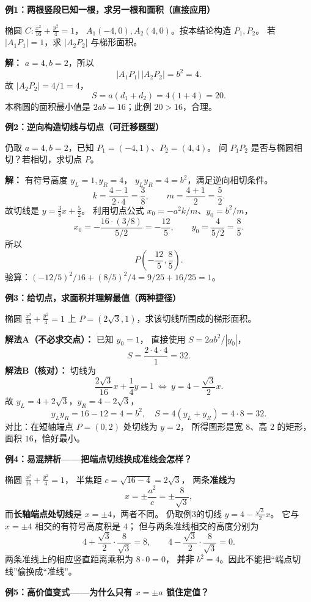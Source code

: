 \begin{examplebox}
\textbf{例1：两根竖段已知一根，求另一根和面积（直接应用）}

椭圆 $C:\frac{x^2}{16}+\frac{y^2}{4}=1$，
$A_1(-4,0),A_2(4,0)$。按本结论构造 $P_1,P_2$。
若 $|A_1P_1|=1$，求 $|A_2P_2|$ 与梯形面积。

\textbf{解：} $a=4,b=2$，所以
\[
|A_1P_1|\,|A_2P_2|=b^2=4.
\]
故 $|A_2P_2|=4/1=4$，
\[
S=a(d_1+d_2)=4(1+4)=\boxed{20}.
\]
本椭圆的面积最小值是 $2ab=16$；此例 $20>16$，合理。

\medskip
\textbf{例2：逆向构造切线与切点（可迁移题型）}

仍取 $a=4,b=2$，已知 $P_1=(-4,1)$、$P_2=(4,4)$。
问 $P_1P_2$ 是否与椭圆相切？若相切，求切点 $P$。

\textbf{解：} 有符号高度 $y_L=1,y_R=4$，
$y_Ly_R=4=b^2$，满足逆向相切条件。
\[
k=\frac{4-1}{2\cdot4}=\frac38,
\qquad m=\frac{4+1}{2}=\frac52.
\]
故切线是 $y=\frac38x+\frac52$。
利用切点公式 $x_0=-a^2k/m$、$y_0=b^2/m$，
\[
x_0=-\frac{16\cdot(3/8)}{5/2}=-\frac{12}{5},
\qquad y_0=\frac4{5/2}=\frac85.
\]
所以
\[
\boxed{P\left(-\frac{12}{5},\frac85\right)}.
\]
验算：$(-12/5)^2/16+(8/5)^2/4=9/25+16/25=1$。

\medskip
\textbf{例3：给切点，求面积并理解最值（两种捷径）}

椭圆 $\frac{x^2}{16}+\frac{y^2}{4}=1$ 上
$P=(2\sqrt3,1)$，求该切线所围成的梯形面积。

\textbf{解法A（不必求交点）：} 已知 $y_0=1$，
直接使用 $S=2ab^2/|y_0|$，
\[
S=\frac{2\cdot4\cdot4}{1}=\boxed{32}.
\]
\textbf{解法B（核对）：} 切线为
\[
\frac{2\sqrt3}{16}x+\frac14y=1
\ \Longleftrightarrow\ y=4-\frac{\sqrt3}{2}x.
\]
故 $y_L=4+2\sqrt3$，$y_R=4-2\sqrt3$，
\[
y_Ly_R=16-12=4=b^2,
\quad S=4(y_L+y_R)=4\cdot8=\boxed{32}.
\]
对比：在短轴端点 $P=(0,2)$ 处切线为 $y=2$，
所得图形是宽 $8$、高 $2$ 的矩形，面积 $16$，恰好最小。

\medskip
\textbf{例4：易混辨析——把端点切线换成准线会怎样？}

椭圆 $\frac{x^2}{16}+\frac{y^2}{4}=1$，
半焦距 $c=\sqrt{16-4}=2\sqrt3$，
两条\textbf{准线}为
\[
x=\pm\frac{a^2}{c}=\pm\frac8{\sqrt3},
\]
而\textbf{长轴端点处切线}是 $x=\pm4$，两者不同。
仍取例3的切线 $y=4-\frac{\sqrt3}{2}x$。
它与 $x=\pm4$ 相交的有符号高度积是 $4$；
但与两条准线相交的高度分别为
\[
4+\frac{\sqrt3}{2}\cdot\frac8{\sqrt3}=8,
\qquad
4-\frac{\sqrt3}{2}\cdot\frac8{\sqrt3}=0.
\]
两条准线上的相应竖直距离乘积为 $8\cdot0=\boxed0$，
\textbf{并非} $b^2=4$。因此不能把“端点切线”偷换成“准线”。

\medskip
\textbf{例5：高价值变式——为什么只有 $x=\pm a$ 锁住定值？}


\end{examplebox}
